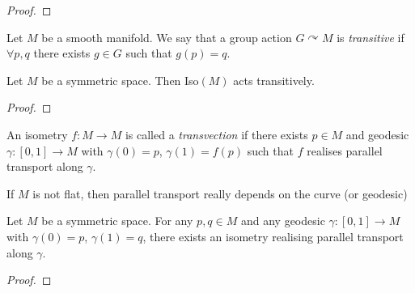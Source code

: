 \documentclass[10pt,a4paper]{article}
\begin{document}
\begin{proof}

\end{proof}

\begin{defn}
Let $M$ be a smooth manifold. We say that a group action $G\curvearrowright M$ is \textit{transitive} if $ \forall p,q$ there exists $g\in G$ such that $g(p)=q$.
\end{defn}

\begin{prop}
Let $M$ be a symmetric space. Then Iso$(M)$ acts transitively.
\end{prop}
\begin{proof}

\end{proof}

\begin{defn}
An isometry $f:M\to M$ is called a \textit{transvection} if there exists $p\in M$ and geodesic $\gamma:[0,1]\to M$ with $\gamma(0) = p$, $\gamma(1)=f(p)$ such that $f$ realises parallel transport along $\gamma$.
\end{defn}

\begin{remark}
If $M$ is not flat, then parallel transport really depends on the curve (or geodesic)
\end{remark}

\begin{prop}
Let $M$ be a symmetric space. For any $p,q\in M$ and any geodesic $\gamma:[0,1]\to M$ with $\gamma(0)= p$, $\gamma(1)=q$, there exists an isometry realising parallel transport along $\gamma$.
\end{prop}
\begin{proof}

\end{proof}
\end{document}
